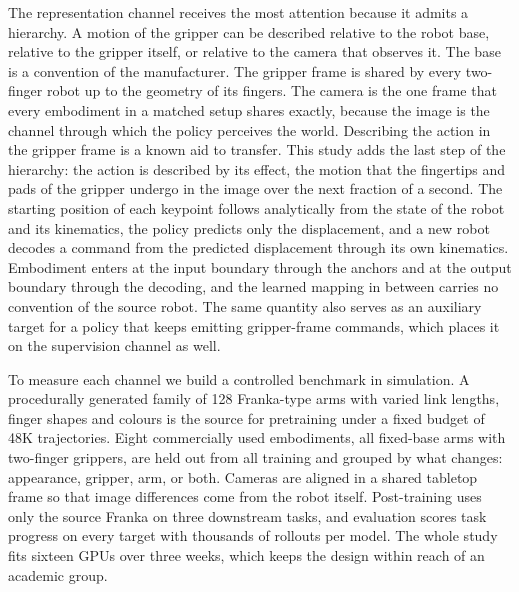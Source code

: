 The representation channel receives the most attention because it admits a hierarchy. A motion of the gripper can be described relative to the robot base, relative to the gripper itself, or relative to the camera that observes it. The base is a convention of the manufacturer. The gripper frame is shared by every two-finger robot up to the geometry of its fingers. The camera is the one frame that every embodiment in a matched setup shares exactly, because the image is the channel through which the policy perceives the world. Describing the action in the gripper frame is a known aid to transfer. This study adds the last step of the hierarchy: the action is described by its effect, the motion that the fingertips and pads of the gripper undergo in the image over the next fraction of a second. The starting position of each keypoint follows analytically from the state of the robot and its kinematics, the policy predicts only the displacement, and a new robot decodes a command from the predicted displacement through its own kinematics. Embodiment enters at the input boundary through the anchors and at the output boundary through the decoding, and the learned mapping in between carries no convention of the source robot. The same quantity also serves as an auxiliary target for a policy that keeps emitting gripper-frame commands, which places it on the supervision channel as well.

To measure each channel we build a controlled benchmark in simulation. A procedurally generated family of 128 Franka-type arms with varied link lengths, finger shapes and colours is the source for pretraining under a fixed budget of 48K trajectories. Eight commercially used embodiments, all fixed-base arms with two-finger grippers, are held out from all training and grouped by what changes: appearance, gripper, arm, or both. Cameras are aligned in a shared tabletop frame so that image differences come from the robot itself. Post-training uses only the source Franka on three downstream tasks, and evaluation scores task progress on every target with thousands of rollouts per model. The whole study fits sixteen GPUs over three weeks, which keeps the design within reach of an academic group.

